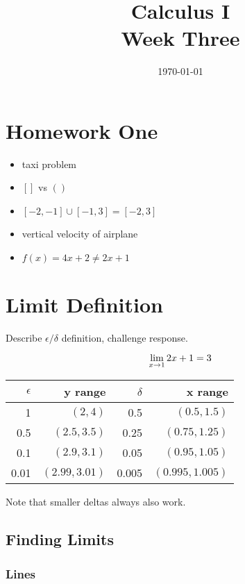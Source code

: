 \documentclass[letterpaper, landscape]{exam}
\author{}
\date{\today}
\title{Calculus I \\ Week Three}
\begin{document}
  \maketitle
  \tableofcontents

  \section{Homework One} 
  \begin{itemize}
    \item taxi problem
    \item $[]$ vs $()$
    \item $[-2, -1] \cup [-1, 3] = [-2, 3]$
    \item vertical velocity of airplane 
    \item $f(x) = 4x + 2 \neq 2x + 1$
  \end{itemize}

  \section{Limit Definition}

  Describe $\epsilon/\delta$ definition, challenge response.

  \[
    \lim_{x \to 1} 2x + 1 = 3 \\
  \]

  \begin{tabular}[H]{rrrr}
    \toprule
    $\epsilon$ & y range        & $\delta$ & x range \\
    \midrule
    1          & $(2, 4)$       & 0.5      & $(0.5, 1.5)$ \\
    0.5        & $(2.5, 3.5)$   & 0.25     & $(0.75, 1.25)$ \\
    0.1        & $(2.9, 3.1)$   & 0.05     & $(0.95, 1.05)$ \\
    0.01       & $(2.99, 3.01)$ & 0.005    & $(0.995, 1.005)$ \\
    \bottomrule
  \end{tabular}

  Note that smaller deltas always also work.

  \subsection{Finding Limits}

  \subsubsection{Lines}
\end{document}
